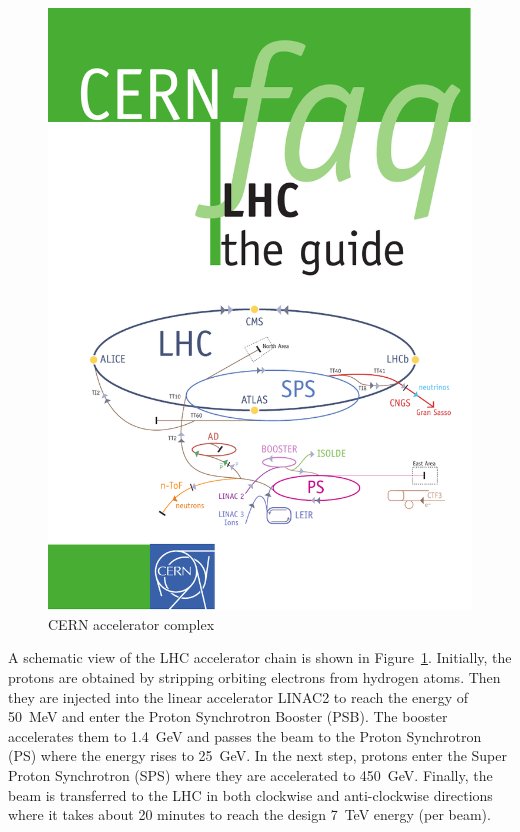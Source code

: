 \begin{figure}[!htbp]
  \centering
  \leavevmode
  \includegraphics[width=\columnwidth]{LHC}
  \caption{CERN accelerator complex}
  \label{fig:LHC}
\end{figure}

A schematic view of the LHC accelerator chain is shown in Figure~\ref{fig:LHC}. Initially, the protons are obtained by
stripping orbiting electrons from hydrogen atoms. Then they are injected into the linear accelerator LINAC2 to reach the
energy of \SI{50}{\MeV} and enter the Proton Synchrotron Booster (PSB). The booster accelerates them to \SI{1.4}{\GeV}
and passes the beam to the Proton Synchrotron (PS) where the energy rises to \SI{25}{\GeV}. In the next step, protons
enter the Super Proton Synchrotron (SPS) where they are accelerated to \SI{450}{\GeV}. Finally, the beam is transferred
to the LHC in both clockwise and anti-clockwise directions where it takes about 20 minutes to reach the design
\SI{7}{\TeV} energy (per beam).

